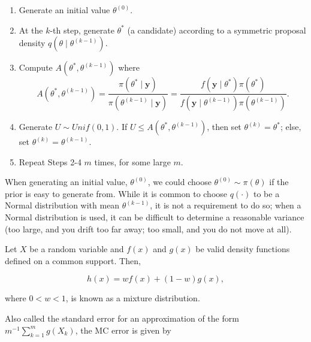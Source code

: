 \documentclass[
  letterpaper,
  DIV=11,
  numbers=noendperiod]{scrreprt}
\providecommand{\tightlist}{%
  \setlength{\itemsep}{0pt}\setlength{\parskip}{0pt}}\usepackage{longtable,booktabs,array}
\theoremstyle{definition}
\theoremstyle{definition}
\theoremstyle{plain}
\theoremstyle{remark}
\begin{document}
\begin{enumerate}
\def\labelenumi{\arabic{enumi}.}
\tightlist
\item
  Generate an initial value \(\theta^{(0)}\).\\
\item
  At the \(k\)-th step, generate \(\theta^*\) (a candidate) according to
  a symmetric proposal density
  \(q\left(\theta \mid \theta^{(k-1)}\right)\).\\
\item
  Compute \(A\left(\theta^*, \theta^{(k-1)}\right)\) where
  \[A\left(\theta^*, \theta^{(k-1)}\right) = \frac{\pi\left(\theta^* \mid \mathbf{y}\right)}{\pi\left(\theta^{(k-1)} \mid \mathbf{y}\right)} = \frac{f\left(\mathbf{y} \mid \theta^*\right) \pi\left(\theta^*\right)}{f\left(\mathbf{y} \mid \theta^{(k-1)}\right) \pi\left(\theta^{(k-1)}\right)}.\]
\item
  Generate \(U \sim Unif(0,1)\). If
  \(U \leq A\left(\theta^*, \theta^{(k-1)}\right)\), then set
  \(\theta^{(k)} = \theta^*\); else, set
  \(\theta^{(k)} = \theta^{(k-1)}\).
\item
  Repeat Steps 2-4 \(m\) times, for some large \(m\).
\end{enumerate}

When generating an initial value, \(\theta^{(0)}\), we could choose
\(\theta^{(0)} \sim \pi(\theta)\) if the prior is easy to generate from.
While it is common to choose \(q(\cdot)\) to be a Normal distribution
with mean \(\theta^{(k-1)}\), it is not a requirement to do so; when a
Normal distribution is used, it can be difficult to determine a
reasonable variance (too large, and you drift too far away; too small,
and you do not move at all).

\begin{description}
\tightlist
\item[Mixture Distribution (Definition~\ref{def-mixture-distribution})]
Let \(X\) be a random variable and \(f(x)\) and \(g(x)\) be valid
density functions defined on a common support. Then,
\end{description}

\[h(x) = wf(x) + (1 - w) g(x),\]

where \(0 < w < 1\), is known as a mixture distribution.

\begin{description}
\tightlist
\item[Monte Carlo Error (Definition~\ref{def-mc-error})]
Also called the standard error for an approximation of the form
\(m^{-1} \sum\limits_{k=1}^{m} g\left(X_k\right)\), the MC error is
given by
\end{description}
\end{document}
